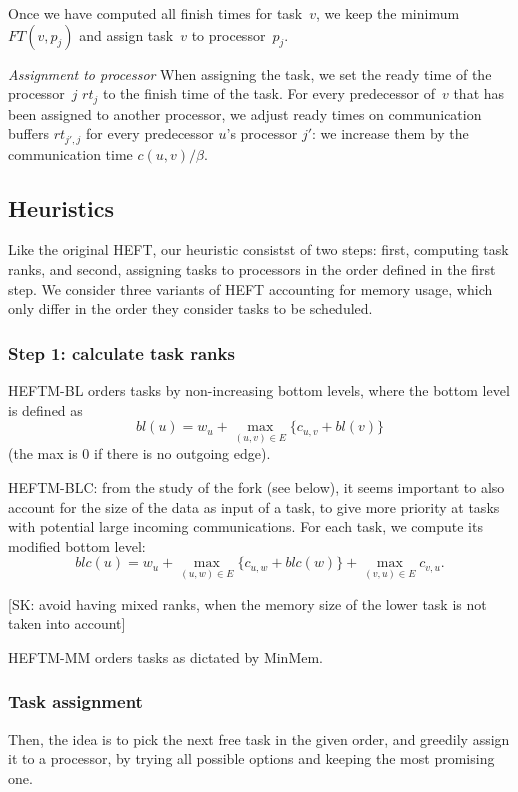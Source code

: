 \documentclass[conference]{IEEEtran}
\newcommand{\skug}[1]{{\color{blue}[SK: #1]}}
\begin{document}
    Once we have computed all finish times for task~$v$,
    we keep the minimum $FT(v,p_j)$ and assign task~$v$
    to processor~$p_j$.

    \textit{Assignment to processor}
    When assigning the task, we set the ready time of the processor~$j$ $rt_j$ to the finish time of the task.
    For every predecessor of~$v$ that has been assigned to another processor, we adjust ready times on
    communication buffers $rt_{j', j}$ for every predecessor $u$'s processor $j'$: we increase them by the
    communication time $c( u,v) / \beta$.

    \subsection{Heuristics}
    Like the original HEFT, our heuristic consistst of two steps: first, computing task ranks,
    and second, assigning tasks to processors in the order defined in the first step.
    We consider three variants of HEFT accounting for memory usage, which only
    differ in the order they consider tasks to be scheduled.

    \subsubsection{Step 1: calculate task ranks}

    HEFTM-BL orders tasks by non-increasing bottom levels, where the bottom
    level is defined as
    $$bl(u) = w_u + \max_{(u,v)\in E} \{c_{u,v} + bl(v)\}$$
    (the max is 0 if there is no outgoing edge).

    HEFTM-BLC: from the study of the fork (see below), it seems important
    to also account for the size of the data as input of a task,
    to give more priority at tasks with potential large incoming communications.
    For each task, we compute its modified bottom level:
    $$blc(u) = w_u + \max_{(u,w)\in E} \{c_{u,w} + blc(w)\} + \max_{(v,u)\in E} c_{v,u}   . $$

    \skug{avoid having mixed ranks, when the memory size of the lower task is not taken into account}

    HEFTM-MM orders tasks as dictated by MinMem.

    \subsubsection{Task assignment}

    Then, the idea is to pick the next free task in the given order,
    and greedily assign it to a processor, by trying all possible options
    and keeping the most promising one.
\end{document}
